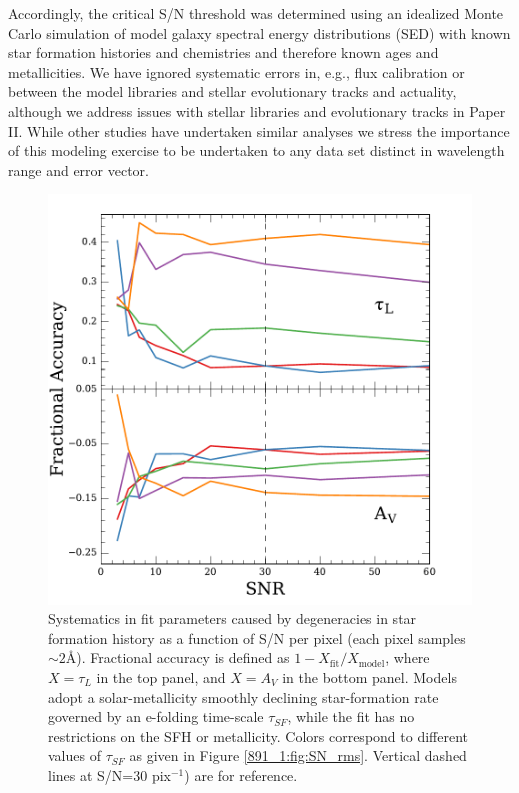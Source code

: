 Accordingly, the critical S/N threshold was determined using an
idealized Monte Carlo simulation of model galaxy spectral energy
distributions (SED) with known star formation histories and
chemistries and therefore known ages and metallicities.  We have
ignored systematic errors in, e.g., flux calibration or between the
model libraries and stellar evolutionary tracks and actuality,
although we address issues with stellar libraries and evolutionary
tracks in Paper II. While other studies have undertaken similar
analyses we stress the importance of this modeling exercise to be
undertaken to any data set distinct in wavelength range and error
vector.

\begin{figure}
  \centering
  \includegraphics[width=\columnwidth]{891_1/figs/SN_sys.pdf}

  \caption[Systematics in model galaxies used for S/N
  determination]{\label{891_1:fig:SN_sys}\fixspacing Systematics in fit
    parameters caused by degeneracies in star formation history as a
    function of S/N per pixel (each pixel samples $\sim 2$\AA).
    Fractional accuracy is defined as $1 -
    X_\mathrm{fit}/X_\mathrm{model}$, where $X = \tau_L$ in the top
    panel, and $X = A_V$ in the bottom panel.  Models adopt a
    solar-metallicity smoothly declining star-formation rate governed
    by an e-folding time-scale $\tau_{SF}$, while the fit has no
    restrictions on the SFH or metallicity. Colors correspond to
    different values of $\tau_{SF}$ as given in Figure
    \ref{891_1:fig:SN_rms}. Vertical dashed lines at S/N=30 pix$^{-1}$) are
    for reference.}
\end{figure}


